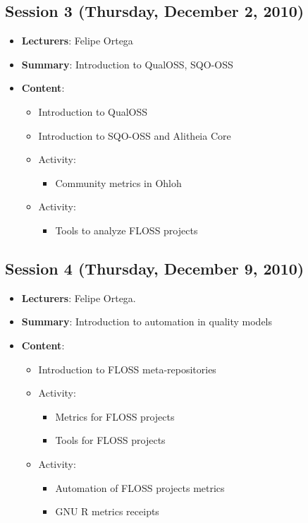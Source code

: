 \documentclass[a4paper]{article}
\begin{document}
\subsection{Session 3 (Thursday, December 2, 2010)}

\begin{itemize}
 \item \textbf{Lecturers}: Felipe Ortega
 \item \textbf{Summary}: Introduction to QualOSS, SQO-OSS
 \item \textbf{Content}:

 \begin{itemize}
      \item Introduction to QualOSS
      \item Introduction to SQO-OSS and Alitheia Core
      \item Activity:
        \begin{itemize}
          \item Community metrics in Ohloh
        \end{itemize}
      \item Activity:
        \begin{itemize}
          \item Tools to analyze FLOSS projects
        \end{itemize}
 \end{itemize}

\end{itemize}

\subsection{Session 4 (Thursday, December 9, 2010)}

\begin{itemize}
 \item \textbf{Lecturers}: Felipe Ortega.
 \item \textbf{Summary}: Introduction to automation in quality models
 \item \textbf{Content}:

 \begin{itemize}
     \item Introduction to FLOSS meta-repositories
     \item Activity:
      \begin{itemize}
        \item Metrics for FLOSS projects
        \item Tools for FLOSS projects
      \end{itemize}
     \item Activity:
      \begin{itemize}
        \item Automation of FLOSS projects metrics
      \end{itemize}
      \begin{itemize}
        \item GNU R metrics receipts
      \end{itemize}

 \end{itemize}


\end{itemize}
\end{document}
